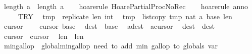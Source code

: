 \begin{isabellebody}
\ \ {\isasymlbrace}length\ {\isasymacute}a\ {\isacharequal}\ length\ \isactrlbsup {\isasymsigma}\isactrlesup a{\isasymrbrace}{\isachardoublequoteclose}\isanewline
%
\isadelimproof
\ \ %
\endisadelimproof
%
\isatagproof
{}\isamarkupfalse%
\ {\isacharparenleft}hoare{\isacharunderscore}rule\ HoarePartial{\isachardot}ProcNoRec{}{\isacharparenright}\isanewline
\ \ \isamarkupfalse%
\ {\isacharparenleft}hoare{\isacharunderscore}rule\ anno{\isacharequal}{\isachardoublequoteopen}\isanewline
\ \ \ \ \ \ TRY\isanewline
\ \ {\isasymacute}tmp\ {\isacharcolon}{\isacharequal}{\isacharequal}\ replicate\ {\isasymacute}len{}\ {\isacharparenleft}{}{\isacharcolon}{\isacharcolon}int{\isacharparenright}{\isacharsemicolon}{\isacharsemicolon}\isanewline
\ \ {\isasymacute}tmp\ {\isacharcolon}{\isacharequal}{\isacharequal}\ list{\isacharunderscore}copy\ {\isasymacute}tmp\ {\isacharparenleft}{}{\isacharcolon}{\isacharcolon}nat{\isacharparenright}\ {\isasymacute}a\ {\isasymacute}base{}\ {\isasymacute}len{}{\isacharsemicolon}{\isacharsemicolon}\isanewline
\ \ {\isasymacute}cursor{}\ {\isacharcolon}{\isacharequal}{\isacharequal}\ {}{\isacharsemicolon}{\isacharsemicolon}\isanewline
\ \ {\isasymacute}cursor{}\ {\isacharcolon}{\isacharequal}{\isacharequal}{\isasymacute}base{}{\isacharsemicolon}{\isacharsemicolon}\isanewline
\ \ {\isasymacute}dest\ {\isacharcolon}{\isacharequal}{\isacharequal}\ {\isasymacute}base{}{\isacharsemicolon}{\isacharsemicolon}\isanewline
\ \ {\isasymacute}a{\isacharbang}{\isasymacute}dest\ {\isacharcolon}{\isacharequal}{\isacharequal}\ {\isasymacute}a{\isacharbang}{\isasymacute}cursor{}{\isacharsemicolon}{\isacharsemicolon}\isanewline
\ \ {\isasymacute}dest\ {\isacharcolon}{\isacharequal}{\isacharequal}\ {\isasymacute}dest{\isacharplus}{}{\isacharsemicolon}{\isacharsemicolon}\isanewline
\ \ {\isasymacute}cursor{}\ {\isacharcolon}{\isacharequal}{\isacharequal}\ {\isasymacute}cursor{}{\isacharplus}{}{\isacharsemicolon}{\isacharsemicolon}\isanewline
\ \ {\isasymacute}len{}\ {\isacharcolon}{\isacharequal}{\isacharequal}\ {\isasymacute}len{}{\isacharminus}{}{\isacharsemicolon}{\isacharsemicolon}\isanewline
\ \ {\isasymacute}min{\isacharunderscore}gallop\ {\isacharcolon}{\isacharequal}{\isacharequal}\ {\isasymacute}global{\isacharunderscore}min{\isacharunderscore}gallop{\isacharsemicolon}{\isacharsemicolon}{\isacharparenleft}{\isacharasterisk}\ need\ to\ add\ min\ gallop\ to\ globals\ var\ {\isacharasterisk}{\isacharparenright}\isanewline

\end{isabellebody}
